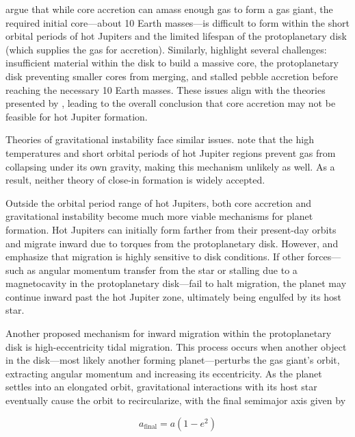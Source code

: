 \documentclass[oneside,12pt]{amsart}
\numberwithin{page}{section}
\begin{document}
\citet{dawson2018origins} argue that while core accretion can amass enough gas to form a gas giant, the required initial core—about 10 Earth masses—is difficult to form within the short orbital periods of hot Jupiters and the limited lifespan of the protoplanetary disk (which supplies the gas for accretion). Similarly, \citet{fortney2021hotjupiters} highlight several challenges: insufficient material within the disk to build a massive core, the protoplanetary disk preventing smaller cores from merging, and stalled pebble accretion before reaching the necessary 10 Earth masses. These issues align with the theories presented by \citet{dawson2018origins}, leading to the overall conclusion that core accretion may not be feasible for hot Jupiter formation.

Theories of gravitational instability face similar issues. \citet{dawson2018origins} note that the high temperatures and short orbital periods of hot Jupiter regions prevent gas from collapsing under its own gravity, making this mechanism unlikely as well. As a result, neither theory of close-in formation is widely accepted.

Outside the orbital period range of hot Jupiters, both core accretion and gravitational instability become much more viable mechanisms for planet formation. Hot Jupiters can initially form farther from their present-day orbits and migrate inward due to torques from the protoplanetary disk. However, \citet{fortney2021hotjupiters} and \citet{dawson2018origins} emphasize that migration is highly sensitive to disk conditions. If other forces—such as angular momentum transfer from the star or stalling due to a magnetocavity in the protoplanetary disk—fail to halt migration, the planet may continue inward past the hot Jupiter zone, ultimately being engulfed by its host star.

Another proposed mechanism for inward migration within the protoplanetary disk is high-eccentricity tidal migration. This process occurs when another object in the disk—most likely another forming planet—perturbs the gas giant’s orbit, extracting angular momentum and increasing its eccentricity. As the planet settles into an elongated orbit, gravitational interactions with its host star eventually cause the orbit to recircularize, with the final semimajor axis given by

\begin{equation}
    a_{\text{final}} = a(1 - e^2)
    \label{eq:final_semimajor_axis}
\end{equation}
\end{document}
